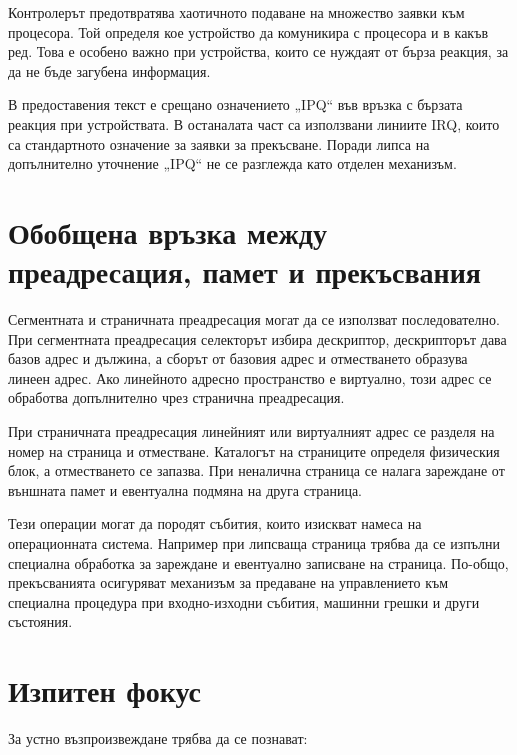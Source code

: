 Контролерът предотвратява хаотичното подаване на множество заявки към процесора. Той определя кое устройство да комуникира с процесора и в какъв ред. Това е особено важно при устройства, които се нуждаят от бърза реакция, за да не бъде загубена информация.

\begin{supp}
В предоставения текст е срещано означението „IPQ“ във връзка с бързата реакция при устройствата. В останалата част са използвани линиите IRQ, които са стандартното означение за заявки за прекъсване. Поради липса на допълнително уточнение „IPQ“ не се разглежда като отделен механизъм.
\end{supp}

\section{Обобщена връзка между преадресация, памет и прекъсвания}\label{s:10.5}

Сегментната и страничната преадресация могат да се използват последователно. При сегментната преадресация селекторът избира дескриптор, дескрипторът дава базов адрес и дължина, а сборът от базовия адрес и отместването образува линеен адрес. Ако линейното адресно пространство е виртуално, този адрес се обработва допълнително чрез странична преадресация.

При страничната преадресация линейният или виртуалният адрес се разделя на номер на страница и отместване. Каталогът на страниците определя физическия блок, а отместването се запазва. При неналична страница се налага зареждане от външната памет и евентуална подмяна на друга страница.

Тези операции могат да породят събития, които изискват намеса на операционната система. Например при липсваща страница трябва да се изпълни специална обработка за зареждане и евентуално записване на страница. По-общо, прекъсванията осигуряват механизъм за предаване на управлението към специална процедура при входно-изходни събития, машинни грешки и други състояния.

\section{Изпитен фокус}\label{s:10.6}

За устно възпроизвеждане трябва да се познават:

